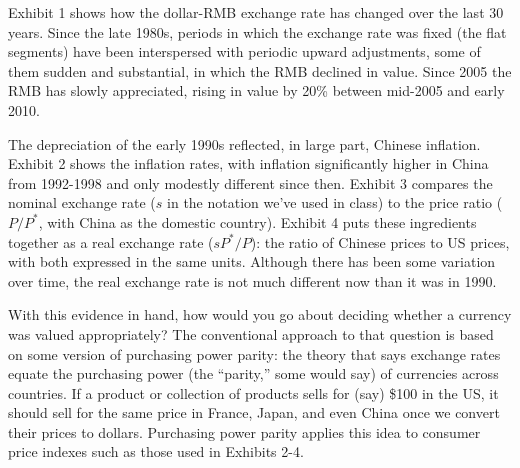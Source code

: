 \documentclass[letterpaper,12pt]{article}
\begin{document}
Exhibit 1 shows how the dollar-RMB exchange rate has changed over
the last 30 years.  
Since the late 1980s, periods in which the exchange rate was fixed 
(the flat segments) have been interspersed with periodic upward 
adjustments, some of them sudden and substantial, 
in which the RMB declined in value.  
Since 2005 the RMB has slowly appreciated, 
rising in value by 20\% between mid-2005 and early 2010.  

The depreciation of the early 1990s reflected, in large
part, Chinese inflation.  
Exhibit 2 shows the inflation rates, 
with inflation significantly higher in China from 1992-1998 
and only modestly different since then.  
Exhibit 3 compares the nominal exchange rate 
($s$ in the notation we've used in class)  
to the price ratio ($P/P^*$, with China as the domestic country).
Exhibit 4 puts these ingredients together as
a real exchange rate ($sP^*/P$):  
the ratio of Chinese prices to US prices, 
with both expressed in the same units.  
Although there has been some variation over time, 
the real exchange rate is not much different now than 
it was in 1990.  

With this evidence in hand, 
how would you go about
deciding whether a currency was valued appropriately?  
The conventional approach to that question is based on 
some version of purchasing power parity:
the theory that says exchange rates equate 
the purchasing power (the ``parity,'' some would say)
of currencies across countries.
If a product or collection of products sells for (say) \$100
in the US, it should sell for the same price in France, 
Japan, and even China once we convert their prices to dollars. 
Purchasing power parity applies this idea to consumer price indexes
such as those used in Exhibits 2-4.  
\end{document}
